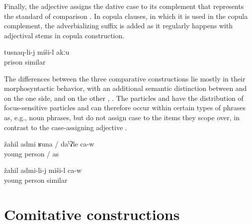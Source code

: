 Finally, the adjective   assigns the dative case to its complement that represents the standard of comparison . In copula clauses, in which it is used in the copula complement, the adverbializing suffix  is added as it regularly happens with adjectival stems in copula construction.
%
\begin{exe}
	\ex	\label{ex:This is not similar to a prison}
	\gll	tusnaq-li-j	miši-l	akːu\\
		prison	similar	\\
	\glt	{}
\end{exe}

The differences between the three comparative constructions lie mostly in their morphosyntactic behavior, with an additional semantic distinction between  and  on the one side, and  on the other , . The particles  and  have the distribution of focus-sensitive particles and can therefore occur within certain types of phrases as, e.g., noun phrases, but do not assign case to the items they scope over, in contrast to the case-assigning adjective .
%
\begin{exe}
	\ex	\label{ex:‎‎‎(He) is like a young man. (i.e. He seems to be young, he looks young or behaves as if he were young)}
	\gll	žahil	admi	ʁuna	/	daˁʡle	ca-w\\
		young	person		/	as	\\
	\glt	{}

	\ex	\label{ex:‎‎‎(He) is similar to a young man}
	\gll	žahil	admi-li-j	miši-l	ca-w\\
		young	person	similar	\\
	\glt	{}
\end{exe}



\section{Comitative constructions}
\label{sec:Comitative constructions}

